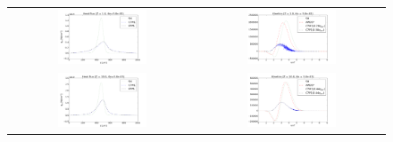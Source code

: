 \documentclass[preprint,12pt]{elsarticle}
\begin{document}
\begin{figure}[tbh]
  \begin{center}
    \begin{tabular}{cc}
      \includegraphics[width=0.5\textwidth]{../results/fe_analysis/figs/P5_heatfluxes_Z1_Kn5e-2.png} &
      \includegraphics[width=0.5\textwidth]{../results/fe_analysis/figs/P5_kinetics_Z1_Kn5e-2.png} \\ 
      \includegraphics[width=0.5\textwidth]{../results/fe_analysis/figs/P5_heatfluxes_Z10_Kn5e-3.png} &
      \includegraphics[width=0.5\textwidth]{../results/fe_analysis/figs/P5_kinetics_Z10_Kn5e-3.png} \\

\end{tabular}
\end{center}
\end{figure}
\end{document}
